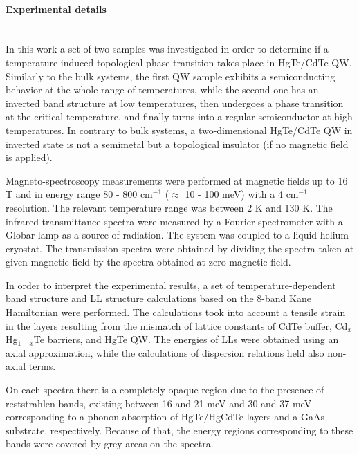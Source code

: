 \documentclass[titlepage,a4paper]{book}
\newcommand{\wciecie}{\quad\phantom{v}}
\newcommand{\myparagraph}[1]{\paragraph{#1}\mbox{}\\}
\begin{document}
\myparagraph{Experimental details}
\wciecie
In this work a set of two samples was investigated in order to determine if a temperature induced topological phase transition takes place in HgTe/CdTe QW. Similarly to the bulk systems, the first QW sample exhibits a semiconducting behavior at the whole range of temperatures, while the second one has an inverted band structure at low temperatures, then undergoes a phase transition at the critical temperature, and finally turns into a regular semiconductor at high temperatures. In contrary to bulk systems, a two-dimensional HgTe/CdTe QW in inverted state is not a semimetal but a topological insulator (if no magnetic field is applied). 

Magneto-spectroscopy measurements were performed at magnetic fields up to 16 T and in energy range 80 - 800 cm$^{-1}$ ($\approx$ 10 - 100 meV) with a 4 cm$^{-1}$ resolution. The relevant temperature range was between 2 K and 130 K. The infrared transmittance spectra were measured by a Fourier spectrometer with a Globar lamp as a source of radiation. The system was coupled to a liquid helium cryostat. The transmission spectra were obtained by dividing the spectra taken at given magnetic field by the spectra obtained at zero magnetic field.

In order to interpret the experimental results, a set of temperature-dependent band structure and LL structure calculations based on the 8-band Kane Hamiltonian were performed. The calculations took into account a tensile strain in the layers resulting from the mismatch of lattice constants of CdTe buffer, Cd$_{x}$Hg$_{1-x}$Te barriers, and HgTe QW. The energies of LLs were obtained using an axial approximation, while the calculations of dispersion relations held also non-axial terms.

On each spectra there is a completely opaque region due to the presence of reststrahlen bands, existing between 16 and 21 meV and 30 and 37 meV corresponding to a phonon absorption of HgTe/HgCdTe layers and a GaAs substrate, respectively. Because of that, the energy regions corresponding to these bands were covered by grey areas on the spectra.

\clearpage
\end{document}
